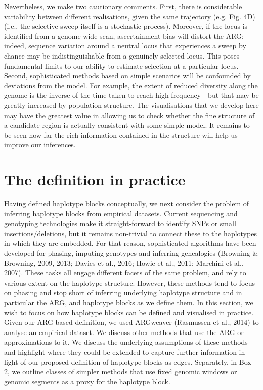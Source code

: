 \documentclass[twocolumn]{bmcart}%
\begin{document}
Nevertheless, we make two cautionary comments. First, there is considerable variability between different realisations, given the same trajectory (e.g. Fig. 4D) (i.e., the selective sweep itself is a stochastic process). Moreover, if the locus is identified from a genome-wide scan, ascertainment bias will distort the ARG: indeed, sequence variation around a neutral locus that experiences a sweep by chance may be indistinguishable from a genuinely selected locus.  This poses fundamental limits to our ability to estimate selection at a particular locus.  Second, sophisticated methods based on simple scenarios will be confounded by deviations from the model. For example, the extent of reduced diversity along the genome is the inverse of the time taken to reach high frequency - but that may be greatly increased by population structure. The visualisations that we develop here may have the greatest value in allowing us to check whether the fine structure of a candidate region is actually consistent with some simple model. It remains to be seen how far the rich information contained in the structure will help us improve our inferences.


\section*{The definition in practice}
Having defined haplotype blocks conceptually, we next consider the problem of inferring haplotype blocks from empirical datasets. Current sequencing and genotyping technologies make it straight-forward to identify SNPs or small insertions/deletions, but it remains non-trivial to connect these to the haplotypes in which they are embedded. For that reason, sophisticated algorithms have been developed for phasing, imputing genotypes and inferring genealogies (Browning \& Browning, 2009, 2013; Davies et al., 2016; Howie et al., 2011; Marchini et al., 2007). These tasks all engage different facets of the same problem, and rely to various extent on the haplotype structure. However, these methods tend to focus on phasing and stop short of inferring underlying haplotype structure and in particular the ARG, and haplotype blocks as we define them. In this section, we wish to focus on how haplotype blocks can be defined and visualised in practice. Given our ARG-based definition, we used ARGweaver (Rasmussen et al., 2014) to analyse an empirical dataset. We discuss other methods that use the ARG or approximations to it. We discuss the underlying assumptions of these methods and highlight where they could be extended to capture further information in light of our proposed definition of haplotype blocks as edges. Separately, in Box 2, we outline classes of simpler methods that use fixed genomic windows or genomic segments as a proxy for the haplotype block.
\end{document}
